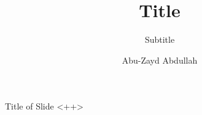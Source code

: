 \documentclass{beamer}
\title[Short Title]{Title}
\subtitle{Subtitle}
\author{Abu-Zayd Abdullah}
\begin{document}
\begin{frame}
\titlepage
\end{frame}

\begin{frame}[t]{Title of Slide} \vspace{4pt}
<++> \pause
\end{frame}
\end{document}
